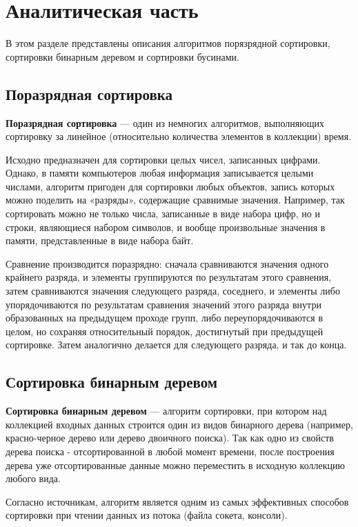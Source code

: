 \chapter{Аналитическая часть}
В этом разделе представлены описания алгоритмов порязрядной сортировки,
сортировки бинарным деревом и сортировки бусинами.

\section{Поразрядная сортировка}

\textbf{Поразрядная сортировка}\cite{sheyker} — один из немногих алгоритмов,
выполняющих сортировку за линейное (относительно количества элементов в
коллекции) время.


Исходно предназначен для сортировки целых чисел, записанных цифрами.
Однако, в памяти компьютеров любая информация записывается целыми числами,
алгоритм пригоден для сортировки любых объектов, запись которых можно поделить
на «разряды», содержащие сравнимые значения. Например, так сортировать можно
не только числа, записанные в виде набора цифр, но и строки, являющиеся набором
символов, и вообще произвольные значения в памяти, представленные в виде
набора байт.


Сравнение производится поразрядно: сначала сравниваются значения одного
крайнего разряда, и элементы группируются по результатам этого сравнения,
затем сравниваются значения следующего разряда, соседнего, и элементы либо
упорядочиваются по результатам сравнения значений этого разряда внутри
образованных на предыдущем проходе групп, либо переупорядочиваются в
целом, но сохраняя относительный порядок, достигнутый при предыдущей
сортировке. Затем аналогично делается для следующего разряда, и так до конца.


\section{Сортировка бинарным деревом}

\textbf{Сортировка бинарным деревом}\cite{insert} — алгоритм сортировки,
при котором над коллекцией входных данных строится один из видов бинарного
дерева (например, красно-черное дерево или дерево двоичного поиска). Так как
одно из свойств дерева поиска - отсортированной в любой момент времени, после
построения дерева уже отсортированные данные можно переместить в исходную
коллекцию любого вида.


Согласно источникам\cite{bintree}, алгоритм является одним из самых эффективных
способов сортировки при чтении данных из потока (файла сокета, консоли).


